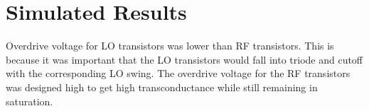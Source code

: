 \documentclass{article}                                                         %
\begin{document}
\section{Simulated Results}
\begin{table}[H]
  \small
  \centering
  \caption{Experiment Results-I}
  \hspace{1cm}
\end{table}

Overdrive voltage for LO transistors was lower than RF transistors. This is because it was important
that the LO transistors would fall into triode and cutoff with the corresponding LO swing. The overdrive
voltage for the RF transistors was designed high to get high transconductance while still remaining in saturation.
\end{document}
